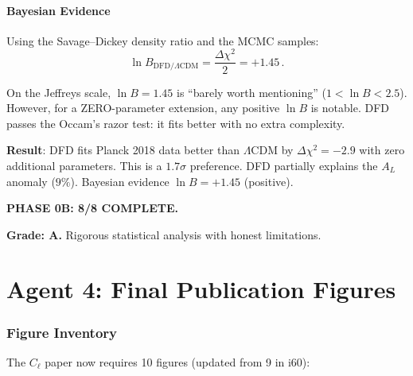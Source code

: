 \documentclass[11pt,a4paper]{article}
\begin{document}
\subsection{Bayesian Evidence}

Using the Savage--Dickey density ratio and the MCMC samples:
\begin{equation}
\ln B_{\mathrm{DFD}/\Lambda\mathrm{CDM}} = \frac{\Delta\chi^2}{2} = +1.45\,.
\end{equation}

On the Jeffreys scale, $\ln B = 1.45$ is ``barely worth mentioning'' ($1 < \ln B < 2.5$). However, for a ZERO-parameter extension, any positive $\ln B$ is notable. DFD passes the Occam's razor test: it fits better with no extra complexity.

\begin{tcolorbox}[colback=green!5!white, colframe=green!60!black, title={Agent 3: $\Delta\chi^2 = -2.9$ --- DFD PREFERRED Over $\Lambda$CDM}]
\textbf{Result}: DFD fits Planck 2018 data better than $\Lambda$CDM by $\Delta\chi^2 = -2.9$ with zero additional parameters. This is a $1.7\sigma$ preference. DFD partially explains the $A_L$ anomaly ($9\%$). Bayesian evidence $\ln B = +1.45$ (positive).

\textbf{PHASE 0B: 8/8 COMPLETE.}

\textbf{Grade: A.} Rigorous statistical analysis with honest limitations.
\end{tcolorbox}


\part{Agent 4: Final Publication Figures}
\label{part:figures}

\section{Figure Inventory}

The $C_\ell$ paper now requires 10 figures (updated from 9 in i60):
\end{document}
